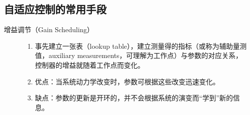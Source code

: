 \subsection{自适应控制的常用手段}
  \begin{description}
    \item[增益调节（Gain Scheduling）]
    \begin{enumerate}
      \item 事先建立一张表（lookup table），建立测量得的指标（或称为辅助量测值，auxiliary measurements，可理解为工作点）与参数的对应关系，
      控制器的增益就随着工作点而变化。
      
      \item 优点：当系统动力学改变时，参数可根据这些改变迅速变化。
      
      \item 缺点：参数的更新是开环的，并不会根据系统的演变而“学到”新的信息。
    \end{enumerate}
  \end{description}

